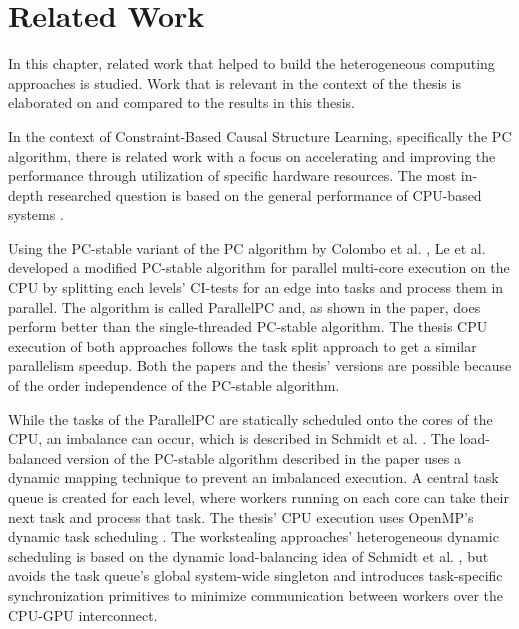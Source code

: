 \chapter{Related Work}
\label{chap:relwork}
In this chapter, related work that helped to build the heterogeneous computing approaches is studied. Work that is relevant in the context of the thesis is elaborated on and compared to the results in this thesis.

In the context of Constraint-Based Causal Structure Learning, specifically the PC algorithm, there is related work with a focus on accelerating and improving the performance through utilization of specific hardware resources. The most in-depth researched question is based on the general performance of CPU-based systems \cite{leFastPCAlgorithm2019, leParallelPCPackageEfficient2018, schmidtLoadBalancedParallelConstraintBased2019, colomboOrderIndependentConstraintBasedCausal2014,kalischEstimatingHighDimensionalDirected2007,scutariBayesianNetworkConstraintBased2017, madsenParallelAlgorithmBayesian2017,madsenParallelisationPCAlgorithm2015,nguyenMrPCCausalStructure2020}. 

Using the PC-stable variant of the PC algorithm by Colombo et al. \cite{colomboOrderIndependentConstraintBasedCausal2014}, Le et al. \cite{leFastPCAlgorithm2019, leParallelPCPackageEfficient2018} developed a modified PC-stable algorithm for parallel multi-core execution on the CPU by splitting each levels' CI-tests for an edge into tasks and process them in parallel. The algorithm is called ParallelPC and, as shown in the paper, does perform better than the single-threaded PC-stable algorithm. The thesis CPU execution of both approaches follows the task split approach to get a similar parallelism speedup. Both the papers and the thesis' versions are possible because of the order independence of the PC-stable algorithm.

While the tasks of the ParallelPC are statically scheduled onto the cores of the CPU, an imbalance can occur, which is described in Schmidt et al. \cite{schmidtLoadBalancedParallelConstraintBased2019}. The load-balanced version of the PC-stable algorithm described in the paper uses a dynamic mapping technique to prevent an imbalanced execution. A central task queue is created for each level, where workers running on each core can take their next task and process that task. The thesis' CPU execution uses OpenMP's dynamic task scheduling \cite{breshearsArtConcurrencyThread2009}. The workstealing approaches' heterogeneous dynamic scheduling is based on the dynamic load-balancing idea of Schmidt et al. \cite{schmidtLoadBalancedParallelConstraintBased2019}, but avoids the task queue's global system-wide singleton and introduces task-specific synchronization primitives to minimize communication between workers over the CPU-GPU interconnect.


